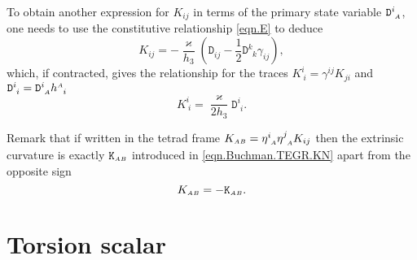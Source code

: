 \documentclass[
10pt, %
a4paper, %
oneside, %
twocolumn,
headinclude,footinclude, %
BCOR5mm, %
]{scrartcl}
\newcommand{\sA}{\mathsmaller A}
\newcommand{\sB}{\mathsmaller B}
\newcommand{\sC}{\mathsmaller C}
\newcommand{\mg}[1]{\kappa_{#1}}			%
\newcommand{\tetrsymbol}{h}
\newcommand{\itetrsymbol}{\eta}
\newcommand{\itetr}[2]{\itetrsymbol^{#1}_{\phantom{#1}#2}}
\newcommand{\tetr}[2]{\tetrsymbol^{#1}_{\phantom{#1}#2}}
\newcommand{\detTetr}{\tetrsymbol}
\newcommand{\Dfin}[2]{\mathtt{D}_{\phantom{#2}#1}^{#2}}	%
\newcommand{\Efin}[2]{\mathtt{E}^{#1}_{\phantom{#1}#2}}	%
\newcommand{\Kbuch}[2]{\mathtt{K}_{{#1}{#2}}}	%
\begin{document}
	To obtain another expression for $ K_{ij} $ in terms of the primary state variable $ 
	\Dfin{\sA}{i} 
	$, one needs to use the constitutive relationship \eqref{eqn.E} to deduce
	\begin{equation}
		K_{ij} = -\frac{\varkappa}{\detTetr_3} 
		\left ( 
		\Dfin{ij}{} - \frac{1}{2} \Dfin{k}{k} \gamma_{ij}
		\right ) ,
	\end{equation}
	which, if contracted, gives the relationship for the traces $ K^i_{\ i} = \gamma^{ij}K_{ji} $ 
	and $ 
	\Dfin{i}{i} =  \Dfin{\sA}{i}\tetr{\sA}{i} $
	\begin{equation}
		K^i_{\ i} = \frac{\varkappa}{2\detTetr_3}\Dfin{i}{i}.
	\end{equation}
	
	Remark that if written in the tetrad frame $ K_{\sA\sB} = 
	\itetr{i}{\sA}\itetr{j}{\sA} K_{ij}$ then the extrinsic curvature is exactly $ \Kbuch{\sA}{\sB} 
	$ 
	introduced in 
	\eqref{eqn.Buchman.TEGR.KN} apart from the opposite sign
	\begin{equation}
		K_{\sA\sB} = -\Kbuch{\sA}{\sB}.
	\end{equation}  
	
	
	
	
	\section{Torsion scalar}\label{sec.closure}
	
	
	
\end{document}
